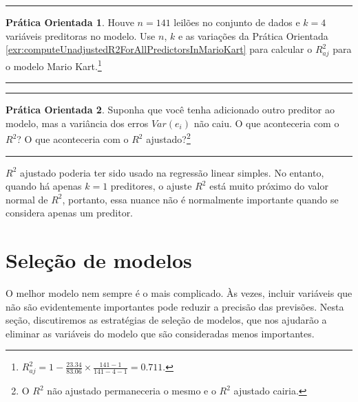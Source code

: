 \documentclass[
]{book}
\theoremstyle{definition}
\theoremstyle{definition}
\theoremstyle{definition}
\newtheorem{exercise}{Prática Orientada}[chapter]
\theoremstyle{definition}
\theoremstyle{remark}
\begin{document}
\begin{center}\rule{0.5\linewidth}{0.5pt}\end{center}

\begin{exercise}
\protect\hypertarget{exr:unnamed-chunk-289}{}{\label{exr:unnamed-chunk-289} }Houve \(n=141\) leilões no conjunto de dados e \(k=4\) variáveis preditoras no modelo. Use \(n\), \(k\) e as variações da Prática Orientada \ref{exr:computeUnadjustedR2ForAllPredictorsInMarioKart} para calcular o \(R_{aj}^2\) para o modelo Mario Kart.\footnote{\(R_{aj}^2 = 1 - \frac{23.34}{83.06}\times \frac{141-1}{141-4-1} = 0.711\).}
\end{exercise}

\begin{center}\rule{0.5\linewidth}{0.5pt}\end{center}

\begin{center}\rule{0.5\linewidth}{0.5pt}\end{center}

\begin{exercise}
\protect\hypertarget{exr:unnamed-chunk-290}{}{\label{exr:unnamed-chunk-290} }Suponha que você tenha adicionado outro preditor ao modelo, mas a variância dos erros \(Var(e_i)\) não caiu. O que aconteceria com o \(R^2\)? O que aconteceria com o \(R^2\) ajustado?\footnote{O \(R^2\) não ajustado permaneceria o mesmo e o \(R^2\) ajustado cairia.}
\end{exercise}

\begin{center}\rule{0.5\linewidth}{0.5pt}\end{center}

\(R^2\) ajustado poderia ter sido usado na regressão linear simples. No entanto, quando há apenas \(k=1\) preditores, o ajuste \(R^2\) está muito próximo do valor normal de \(R^2\), portanto, essa nuance não é normalmente importante quando se considera apenas um preditor.

\hypertarget{modelSelection}{%
\section{Seleção de modelos}\label{modelSelection}}

O melhor modelo nem sempre é o mais complicado. Às vezes, incluir variáveis que não são evidentemente importantes pode reduzir a precisão das previsões. Nesta seção, discutiremos as estratégias de seleção de modelos, que nos ajudarão a eliminar as variáveis do modelo que são consideradas menos importantes.
\end{document}
